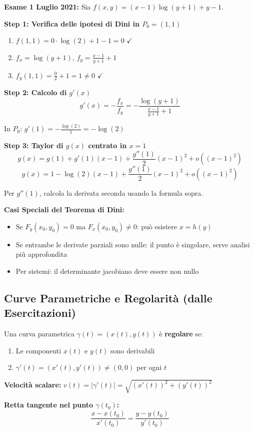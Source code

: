 \begin{esempio}
\textbf{Esame 1 Luglio 2021:} Sia \(f(x,y) = (x-1)\log(y+1) + y - 1\).

\textbf{Step 1: Verifica delle ipotesi di Dini in \(P_0=(1,1)\)}
\begin{enumerate}
    \item \(f(1,1) = 0 \cdot \log(2) + 1 - 1 = 0\) $\checkmark$
    \item \(f_x = \log(y+1)\), \(f_y = \frac{x-1}{y+1} + 1\)
    \item \(f_y(1,1) = \frac{0}{2} + 1 = 1 \neq 0\) $\checkmark$
\end{enumerate}

\textbf{Step 2: Calcolo di \(g'(x)\)}
\[ g'(x) = -\frac{f_x}{f_y} = -\frac{\log(y+1)}{\frac{x-1}{y+1} + 1} \]

In \(P_0\): \(g'(1) = -\frac{\log(2)}{1} = -\log(2)\)

\textbf{Step 3: Taylor di \(g(x)\) centrato in \(x=1\)}
\[ g(x) = g(1) + g'(1)(x-1) + \frac{g''(1)}{2}(x-1)^2 + o((x-1)^2) \]
\[ g(x) = 1 - \log(2)(x-1) + \frac{g''(1)}{2}(x-1)^2 + o((x-1)^2) \]

Per \(g''(1)\), calcola la derivata seconda usando la formula sopra.
\end{esempio}

\begin{info}
\textbf{Casi Speciali del Teorema di Dini:}
\begin{itemize}
    \item Se \(F_y(x_0,y_0) = 0\) ma \(F_x(x_0,y_0) \neq 0\): può esistere \(x = h(y)\)
    \item Se entrambe le derivate parziali sono nulle: il punto è singolare, serve analisi più approfondita
    \item Per sistemi: il determinante jacobiano deve essere non nullo
\end{itemize}
\end{info}

\subsection{Curve Parametriche e Regolarità (dalle Esercitazioni)}

\begin{info}
Una curva parametrica $\gamma(t) = (x(t), y(t))$ è \textbf{regolare} se:
\begin{enumerate}
    \item Le componenti $x(t)$ e $y(t)$ sono derivabili
    \item $\gamma'(t) = (x'(t), y'(t)) \neq (0,0)$ per ogni $t$
\end{enumerate}

\textbf{Velocità scalare:} $v(t) = |\gamma'(t)| = \sqrt{(x'(t))^2 + (y'(t))^2}$

\textbf{Retta tangente nel punto $\gamma(t_0)$:}
\[ \frac{x - x(t_0)}{x'(t_0)} = \frac{y - y(t_0)}{y'(t_0)} \]
\end{info}

